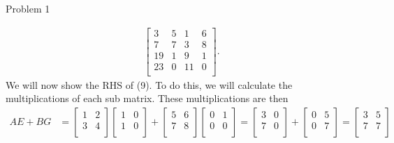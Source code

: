 \begin{problem}{Problem 1}
\begin{Highlight}[Solution]
\begin{align*}
\begin{bmatrix}
                3 & 5 & 1 & 6 \\
                7 & 7 & 3 & 8 \\
                19 & 1 & 9 & 1 \\
                23 & 0 & 11 & 0 \\
            \end{bmatrix}.
        \end{align*}
        We will now show the RHS of (9). To do this, we will calculate the multiplications of each sub matrix. These multiplications are then 
        \begin{align*}
            AE + BG & = 
            \begin{bmatrix}
                1 & 2 \\
                3 & 4 \\
            \end{bmatrix}
            \begin{bmatrix}
                1 & 0 \\
                1 & 0 \\
            \end{bmatrix}
            + 
            \begin{bmatrix}
                5 & 6 \\
                7 & 8 \\
            \end{bmatrix}
            \begin{bmatrix}
                0 & 1 \\
                0 & 0 \\
            \end{bmatrix}
            = 
            \begin{bmatrix}
                3 & 0 \\
                7 & 0 \\
            \end{bmatrix}
            + 
            \begin{bmatrix}
                0 & 5 \\
                0 & 7 \\
            \end{bmatrix}
            = 
            \begin{bmatrix}
                3 & 5 \\
                7 & 7 \\
            \end{bmatrix} \\

\end{align*}
\end{Highlight}
\end{problem}
